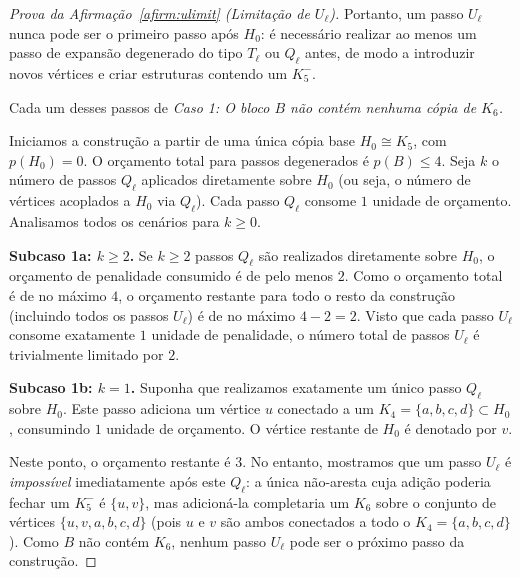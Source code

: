 \documentclass[reqno, 12pt]{amsart}
\numberwithin{equation}{section}
\theoremstyle{plain}
\theoremstyle{definition}
\begin{document}
\begin{proof}[Prova da Afirmação~\ref{afirm:ulimit} (Limitação de $U_\ell$)]
    Portanto, um passo $U_\ell$ nunca pode ser o primeiro passo após $H_0$: é
    necessário realizar ao menos um passo de expansão degenerado do tipo $T_\ell$ ou
    $Q_\ell$ antes, de modo a introduzir novos vértices e criar estruturas contendo um $K_5^-$.

    Cada um desses passos de  \medskip
    \noindent\textit{Caso 1: O bloco $B$ não contém nenhuma cópia de $K_6$.}

    \medskip

    Iniciamos a construção a partir de uma única cópia base $H_0 \cong K_5$, com
    $p(H_0) = 0$. O orçamento total para passos degenerados é $p(B) \le 4$.
    Seja $k$ o número de passos $Q_\ell$ aplicados diretamente sobre $H_0$ (ou seja,
    o número de vértices acoplados a $H_0$ via $Q_\ell$). Cada passo $Q_\ell$ consome $1$ unidade
    de orçamento. Analisamos todos os cenários para $k \ge 0$.

    \medskip
    \noindent\textbf{Subcaso 1a: $k \ge 2$.}
    Se $k \ge 2$ passos $Q_\ell$ são realizados diretamente sobre $H_0$, o orçamento de penalidade
    consumido é de pelo menos $2$. Como o orçamento total é de no máximo $4$, o orçamento
    restante para todo o resto da construção (incluindo todos os passos $U_\ell$) é de no máximo
    $4 - 2 = 2$. Visto que cada passo $U_\ell$ consome exatamente $1$ unidade de penalidade,
    o número total de passos $U_\ell$ é trivialmente limitado por $2$.

    \medskip
    \noindent\textbf{Subcaso 1b: $k = 1$.}
    Suponha que realizamos exatamente um único passo $Q_\ell$ sobre $H_0$. Este passo adiciona
    um vértice $u$ conectado a um $K_4 = \{a,b,c,d\} \subset H_0$, consumindo $1$ unidade de orçamento.
    O vértice restante de $H_0$ é denotado por $v$.

    Neste ponto, o orçamento restante é $3$. No entanto, mostramos que um passo $U_\ell$ é
    \emph{impossível} imediatamente após este $Q_\ell$: a única não-aresta cuja adição poderia
    fechar um $K_5^-$ é $\{u,v\}$, mas adicioná-la completaria um $K_6$ sobre o conjunto
    de vértices $\{u,v,a,b,c,d\}$ (pois $u$ e $v$ são ambos conectados a todo o $K_4 = \{a,b,c,d\}$).
    Como $B$ não contém $K_6$, nenhum passo $U_\ell$ pode ser o próximo passo da construção.


\end{proof}
\end{document}
